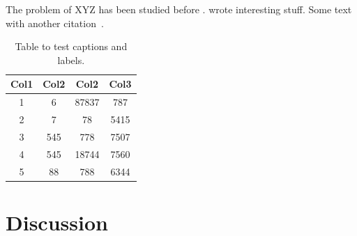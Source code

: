 \documentclass[11pt]{article}
\begin{document}
The problem  of XYZ has been studied before \cite{Lamport:Book:1989}.
\citet{Burkhardt:JNS:2019} wrote interesting stuff.
Some text with another citation~\cite{article-minimal}.

\begin{table}[tbh!]
\caption{Table to test captions and labels.\label{tab:example}}
\centering
\begin{tabular}{|c c c c|}
 \hline
 Col1 & Col2 & Col2 & Col3 \\ [0.5ex]
 \hline\hline
 1 & 6 & 87837 & 787 \\
 2 & 7 & 78 & 5415 \\
 3 & 545 & 778 & 7507 \\
 4 & 545 & 18744 & 7560 \\
 5 & 88 & 788 & 6344 \\ [1ex]
 \hline
\end{tabular}
\end{table}

\section*{Discussion}
\label{sec:discussion}
%
%
%
\blindtext
\end{document}
